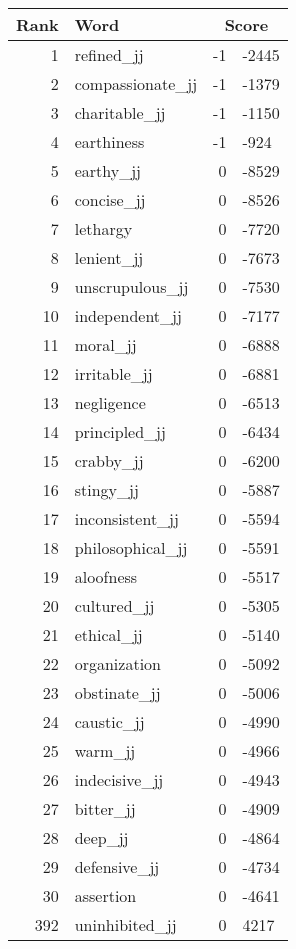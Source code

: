 \begin{longtable}[!htbp]{| rlr@{.}l |}
    \hline
    \textbf{Rank} & \textbf{Word} & \multicolumn{2}{c|}{\textbf{Score}} \\
    \hline
    \endhead
    1 & refined\_jj & -1 & -2445 \\
    2 & compassionate\_jj & -1 & -1379 \\
    3 & charitable\_jj & -1 & -1150 \\
    4 & earthiness & -1 & -924 \\
    5 & earthy\_jj & 0 & -8529 \\
    6 & concise\_jj & 0 & -8526 \\
    7 & lethargy & 0 & -7720 \\
    8 & lenient\_jj & 0 & -7673 \\
    9 & unscrupulous\_jj & 0 & -7530 \\
    10 & independent\_jj & 0 & -7177 \\
    11 & moral\_jj & 0 & -6888 \\
    12 & irritable\_jj & 0 & -6881 \\
    13 & negligence & 0 & -6513 \\
    14 & principled\_jj & 0 & -6434 \\
    15 & crabby\_jj & 0 & -6200 \\
    16 & stingy\_jj & 0 & -5887 \\
    17 & inconsistent\_jj & 0 & -5594 \\
    18 & philosophical\_jj & 0 & -5591 \\
    19 & aloofness & 0 & -5517 \\
    20 & cultured\_jj & 0 & -5305 \\
    21 & ethical\_jj & 0 & -5140 \\
    22 & organization & 0 & -5092 \\
    23 & obstinate\_jj & 0 & -5006 \\
    24 & caustic\_jj & 0 & -4990 \\
    25 & warm\_jj & 0 & -4966 \\
    26 & indecisive\_jj & 0 & -4943 \\
    27 & bitter\_jj & 0 & -4909 \\
    28 & deep\_jj & 0 & -4864 \\
    29 & defensive\_jj & 0 & -4734 \\
    30 & assertion & 0 & -4641 \\
    392 & uninhibited\_jj & 0 & 4217 \\

\end{longtable}
